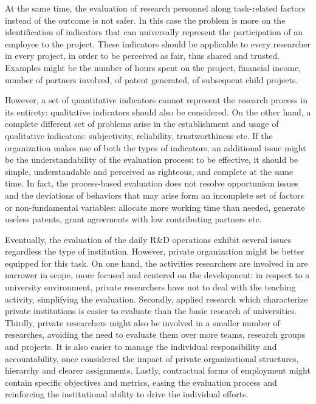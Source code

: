 At the same time, the evaluation of research personnel along task-related factors instead of the outcome is not safer. In this case the problem is more on the identification of indicators that can universally represent the participation of an employee to the project. These indicators should be applicable to every researcher in every project, in order to be perceived as fair, thus shared and trusted. Examples might be the number of hours spent on the project, financial income, number of partners involved, of patent generated, of subsequent child projects. 

However, a set of quantitative indicators cannot represent the research process in its entirety: qualitative indicators should also be considered. On the other hand, a complete different set of problems arise in the establishment and usage of qualitative indicators: subjectivity, reliability, trustworthiness etc. If the organization makes use of both the types of indicators, an additional issue might be the understandability of the evaluation process: to be effective, it should be simple, understandable and perceived as righteous, and complete at the same time. In fact, the process-based evaluation does not resolve opportunism issues and the deviations of behaviors that may arise form an incomplete set of factors or non-fundamental variables: allocate more working time than needed, generate useless patents, grant agreements with low contributing partners etc. 

Eventually, the evaluation of the daily R\&D operations exhibit several issues regardless the type of institution. However, private organization might be better equipped for this task. On one hand, the activities researchers are involved in are narrower in scope, more focused and centered on the development: in respect to a university environment, private researchers have not to deal with the teaching activity, simplifying the evaluation. Secondly, applied research which characterize private institutions is easier to evaluate than the basic research of universities. Thirdly, private researchers might also be involved in a smaller number of researches, avoiding the need to evaluate them over more teams, research groups and projects. It is also easier to manage the individual responsibility and accountability, once considered the impact of private organizational structures, hierarchy and clearer assignments. Lastly, contractual forms of employment might contain specific objectives and metrics, easing the evaluation process and reinforcing the institutional ability to drive the individual efforts. 


